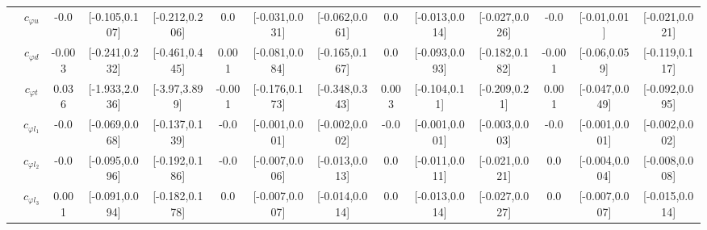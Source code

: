 \documentclass{article}
\begin{document}
\begin{table}[H]
\begin{tabular}{|c|c|c|c|c|c|c|c|c|c|c|c|c|c|}
 & $c_{\varphi u}$ & -0.0                             & [-0.105,0.107]                                 & [-0.212,0.206] & 0.0                             & [-0.031,0.031]                                 & [-0.062,0.061] & 0.0                             & [-0.013,0.014]                                 & [-0.027,0.026] & -0.0                             & [-0.01,0.01]                                 & [-0.021,0.021] \\ \cline{2-14}
 & $c_{\varphi d}$ & -0.003                             & [-0.241,0.232]                                 & [-0.461,0.445] & 0.001                             & [-0.081,0.084]                                 & [-0.165,0.167] & 0.0                             & [-0.093,0.093]                                 & [-0.182,0.182] & -0.001                             & [-0.06,0.059]                                 & [-0.119,0.117] \\ \cline{2-14}
 & $c_{\varphi t}$ & 0.036                             & [-1.933,2.036]                                 & [-3.97,3.899] & -0.001                             & [-0.176,0.173]                                 & [-0.348,0.343] & 0.003                             & [-0.104,0.11]                                 & [-0.209,0.21] & 0.001                             & [-0.047,0.049]                                 & [-0.092,0.095] \\ \cline{2-14}
 & $c_{\varphi l_1}$ & -0.0                             & [-0.069,0.068]                                 & [-0.137,0.139] & -0.0                             & [-0.001,0.001]                                 & [-0.002,0.002] & -0.0                             & [-0.001,0.001]                                 & [-0.003,0.003] & -0.0                             & [-0.001,0.001]                                 & [-0.002,0.002] \\ \cline{2-14}
 & $c_{\varphi l_2}$ & -0.0                             & [-0.095,0.096]                                 & [-0.192,0.186] & -0.0                             & [-0.007,0.006]                                 & [-0.013,0.013] & 0.0                             & [-0.011,0.011]                                 & [-0.021,0.021] & 0.0                             & [-0.004,0.004]                                 & [-0.008,0.008] \\ \cline{2-14}
 & $c_{\varphi l_3}$ & 0.001                             & [-0.091,0.094]                                 & [-0.182,0.178] & 0.0                             & [-0.007,0.007]                                 & [-0.014,0.014] & 0.0                             & [-0.013,0.014]                                 & [-0.027,0.027] & 0.0                             & [-0.007,0.007]                                 & [-0.015,0.014] \\ \cline{2-14}

\end{tabular}
\end{table}
\end{document}
